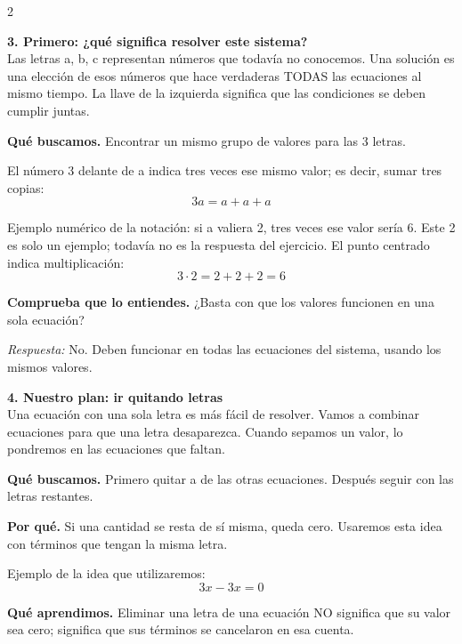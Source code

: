 \documentclass[11pt,a4paper,landscape]{article}
\begin{document}
\begin{multicols*}{2}
\begin{minipage}{\linewidth}
\end{minipage}\par\medskip
\noindent\begin{minipage}{\linewidth}\textbf{3. Primero: ¿qué significa resolver este sistema?}\\[2pt]Las letras a, b, c representan números que todavía no conocemos. Una solución es una elección de esos números que hace verdaderas TODAS las ecuaciones al mismo tiempo. La llave de la izquierda significa que las condiciones se deben cumplir juntas.
\par\smallskip\textbf{Qué buscamos.} Encontrar un mismo grupo de valores para las 3 letras.
\par\smallskip El número 3 delante de a indica tres veces ese mismo valor; es decir, sumar tres copias:
\[3a=a+a+a\]
\par\smallskip Ejemplo numérico de la notación: si a valiera 2, tres veces ese valor sería 6. Este 2 es solo un ejemplo; todavía no es la respuesta del ejercicio. El punto centrado indica multiplicación:
\[3\cdot 2=2+2+2=6\]
\par\smallskip\textbf{Comprueba que lo entiendes.} ¿Basta con que los valores funcionen en una sola ecuación?\par\textit{Respuesta:} No. Deben funcionar en todas las ecuaciones del sistema, usando los mismos valores.
\end{minipage}\par\medskip
\noindent\begin{minipage}{\linewidth}\textbf{4. Nuestro plan: ir quitando letras}\\[2pt]Una ecuación con una sola letra es más fácil de resolver. Vamos a combinar ecuaciones para que una letra desaparezca. Cuando sepamos un valor, lo pondremos en las ecuaciones que faltan.
\par\smallskip\textbf{Qué buscamos.} Primero quitar a de las otras ecuaciones. Después seguir con las letras restantes.
\par\smallskip\textbf{Por qué.} Si una cantidad se resta de sí misma, queda cero. Usaremos esta idea con términos que tengan la misma letra.
\par\smallskip Ejemplo de la idea que utilizaremos:
\[3x-3x=0\]
\par\smallskip\textbf{Qué aprendimos.} Eliminar una letra de una ecuación NO significa que su valor sea cero; significa que sus términos se cancelaron en esa cuenta.
\end{minipage}\par\medskip

\end{multicols*}
\end{document}
